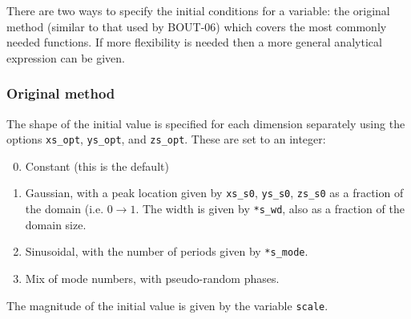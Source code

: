 \documentclass[12pt]{article}
\newcommand{\code}[1]{\texttt{#1}}
\begin{document}
There are two ways to specify the initial conditions for a variable: the
original method (similar to that used by BOUT-06) which covers the most
commonly needed functions. If more flexibility is needed then a more general
analytical expression can be given.


\subsubsection{Original method}
%
The shape of the initial value is specified for each dimension separately using
the options \code{xs\_opt}, \code{ys\_opt}, and \code{zs\_opt}. These are set
to an integer:
%
\begin{enumerate}
\setcounter{enumi}{-1}
\item Constant (this is the default)
\item Gaussian, with a peak location given by \code{xs\_s0}, \code{ys\_s0},
    \code{zs\_s0} as a fraction of the domain (i.e. $0 \rightarrow 1$.  The
    width is given by \code{*s\_wd}, also as a fraction of the domain size.
\item Sinusoidal, with the number of periods given by \code{*s\_mode}.
\item Mix of mode numbers, with pseudo-random phases.
\end{enumerate}
%
The magnitude of the initial value is given by the variable \code{scale}.
\end{document}
